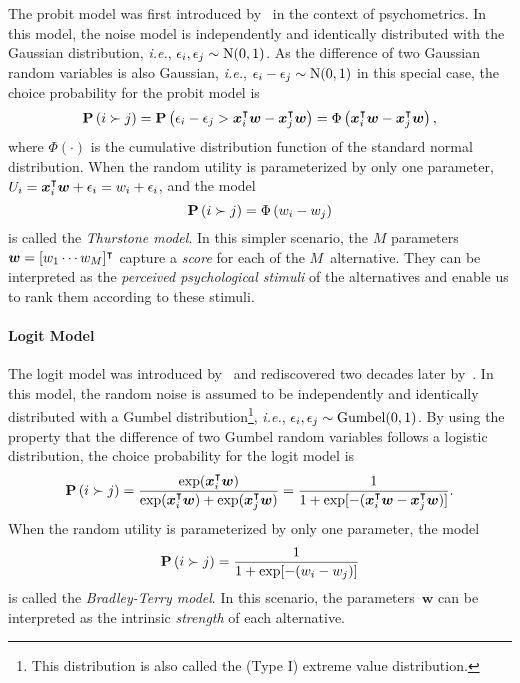 The probit model was first introduced by~\citet{thurstone1927law} in the context of psychometrics.
In this model, the noise model is independently and identically distributed with the Gaussian distribution, \textit{i.e.}, $\epsilon_i, \epsilon_j \sim \mathrm{N}( 0, 1 )$.
As the difference of two Gaussian random variables is also Gaussian, \textit{i.e.}, $\epsilon_i - \epsilon_j \sim \mathrm{N}( 0, 1 )$ in this special case, the choice probability for the probit model is
\begin{equation}
  \mathbf{P}\left( i \succ j \right) = \mathbf{P}\left( \epsilon_i - \epsilon_j > \bm{x}_i^\intercal \bm{w} - \bm{x}_j^\intercal \bm{w} \right) = \Phi \left( \bm{x}_i^\intercal \bm{w} - \bm{x}_j^\intercal \bm{w} \right),
\end{equation}
where $\Phi( \cdot )$ is the cumulative distribution function of the standard normal distribution.
When the random utility is parameterized by only one parameter, $U_i = \bm{x}_i^\intercal \bm{w} + \epsilon_i = w_i + \epsilon_i$, and the model
\begin{equation}
  \mathbf{P}\left( i \succ j \right) = \Phi \left( w_i - w_j \right)
\end{equation}
is called the \emph{Thurstone model}.
In this simpler scenario, the $M$ parameters~$\bm{w} = [w_1 \cdots w_M]^\intercal$ capture a \emph{score} for each of the $M$~alternative.
They can be interpreted as the \emph{perceived psychological stimuli} of the alternatives and enable us to rank them according to these stimuli.

\paragraph{Logit Model}

The logit model was introduced by~\citet{zermelo1928berechnung} and rediscovered two decades later by~\citet{bradley1952rank}.
In this model, the random noise is assumed to be independently and identically distributed with a Gumbel distribution\footnote{This distribution is also called the (Type I) extreme value distribution.}, \textit{i.e.}, $\epsilon_i, \epsilon_j \sim \mathrm{Gumbel}( 0, 1 )$.
By using the property that the difference of two Gumbel random variables follows a logistic distribution, the choice probability for the logit model is
\begin{equation}
  \Prob{i \succ j} = \frac{\exp(\bm{x}_i\Tr \bm{w})}{\exp(\bm{x}_i\Tr \bm{w}) + \exp(\bm{x}_j\Tr \bm{w})} = \frac{1}{1 + \exp[-(\bm{x}_i\Tr \bm{w} - \bm{x}_j\Tr \bm{w})]}. %
\end{equation}
When the random utility is parameterized by only one parameter, the model
\begin{equation}
  \label{eq:bradley-terry}
  \mathbf{P}\left( i \succ j \right) = \frac{1}{1 + \exp[-(w_i - w_j)]}
\end{equation}
is called the \emph{Bradley-Terry model}.
In this scenario, the parameters~$\bm{w}$ can be interpreted as the intrinsic \emph{strength} of each alternative.

